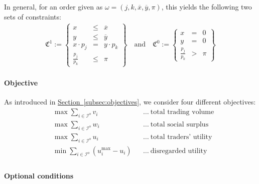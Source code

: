 \documentclass[11pt,parskip=full]{scrartcl}%
\newcommand*{\iorders}{\mathcal{I}^o}       %
\newcommand*{\secref}[1]{\hyperref[{#1}]{Section~\ref*{#1}}}
\begin{document}
In general, for an order given as $ \omega = (j,k,\overline{x},\overline{y},\pi) $, this yields
the following two sets of constraints:
\begin{align}
  \mathfrak{C}^1 := \left\{
  \begin{array}{rll}
    x &\le & \overline{x} \\
    y &\le & \overline{y} \\
    x \cdot p_j &= & y \cdot p_k \\[1mm]
    \frac{p_j}{p_k} &\le & \pi
  \end{array}
  \right\}
  \quad
  \text{and}
  \quad
  \mathfrak{C}^0 := \left\{
  \begin{array}{rll}
    x &= & 0 \\
    y &= & 0 \\[1mm]
    \frac{p_j}{p_k} &> & \pi
  \end{array}
  \right\}
  \label{eq:order_model_generic}
\end{align}

\paragraph{Objective}

As introduced in \secref{subsec:objectives}, we consider four different objectives:
\begin{align*}
  && &\max\sum_{i \in \iorders} v_i && \ldots\>\text{total trading volume}&&\\
  && &\max\sum_{i \in \iorders} w_i && \ldots\>\text{total social surplus}&&\\
  && &\max\sum_{i \in \iorders} u_i && \ldots\>\text{total traders' utility}&&\\
  && &\min\sum_{i \in \iorders} (u^{\max}_i - u_i) && \ldots\>\text{disregarded utility}&&\\
\end{align*}


\paragraph{Optional conditions}
\end{document}
